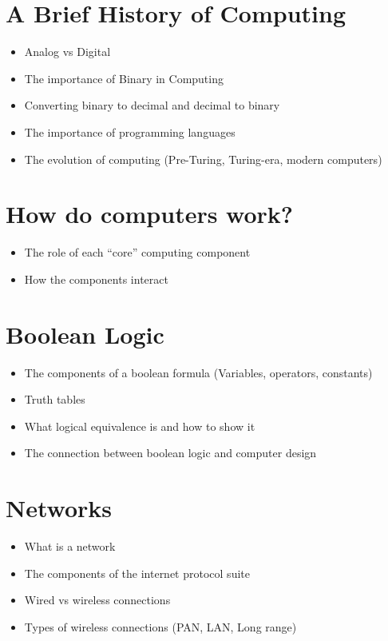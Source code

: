 \documentclass{article}
\begin{document}
\pagestyle{fancy}

\section*{A Brief History of Computing}
\begin{itemize}
    \item Analog vs Digital
    \item The importance of Binary in Computing
    \item Converting binary to decimal and decimal to binary
    \item The importance of programming languages
    \item The evolution of computing (Pre-Turing, Turing-era, modern computers)
\end{itemize}

\section*{How do computers work?}
\begin{itemize}
    \item The role of each ``core'' computing component
    \item How the components interact
\end{itemize}

\section*{Boolean Logic}
\begin{itemize}
    \item The components of a boolean formula (Variables, operators, constants)
    \item Truth tables
    \item What logical equivalence is and how to show it
    \item The connection between boolean logic and computer design
\end{itemize}

\section*{Networks}
\begin{itemize}
    \item What is a network
    \item The components of the internet protocol suite
    \item Wired vs wireless connections
    \item Types of wireless connections (PAN, LAN, Long range)
\end{itemize}
\end{document}
